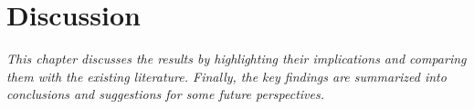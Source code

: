 ﻿%

%

\chapter{Discussion}
\label{cha:discussion}

\textit{This chapter discusses the results by highlighting their implications and comparing them with the existing literature. Finally, the key findings are summarized into conclusions and suggestions for some future perspectives.}

